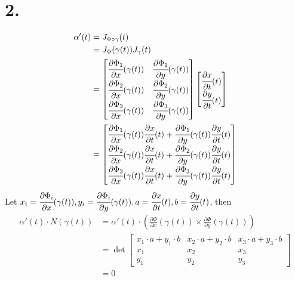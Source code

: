 \documentclass[11pt]{article}
\begin{document}
\section*{2.}
\begin{equation*}
    \begin{aligned}
        \alpha'(t) 
        &= J_{\Phi \circ \gamma}(t) \\
        &= J_\Phi(\gamma(t)) J_\gamma(t) \\
        &= 
        \begin{bmatrix}
            \cfrac{\partial \Phi_1}{\partial x}(\gamma(t)) & \cfrac{\partial \Phi_1}{\partial y}(\gamma(t)) \\
            \cfrac{\partial \Phi_2}{\partial x}(\gamma(t)) & \cfrac{\partial \Phi_2}{\partial y}(\gamma(t)) \\
            \cfrac{\partial \Phi_3}{\partial x}(\gamma(t)) & \cfrac{\partial \Phi_3}{\partial y}(\gamma(t)) 
        \end{bmatrix}
        \begin{bmatrix}
            \cfrac{\partial x}{\partial t}(t) \\
            \cfrac{\partial y}{\partial t}(t) 
        \end{bmatrix} \\
        &= 
        \begin{bmatrix}
            \cfrac{\partial \Phi_1}{\partial x}(\gamma(t)) \cfrac{\partial x}{\partial t}(t) + \cfrac{\partial \Phi_1}{\partial y}(\gamma(t)) \cfrac{\partial y}{\partial t}(t) \\
            \cfrac{\partial \Phi_2}{\partial x}(\gamma(t)) \cfrac{\partial x}{\partial t}(t) + \cfrac{\partial \Phi_2}{\partial y}(\gamma(t)) \cfrac{\partial y}{\partial t}(t) \\
            \cfrac{\partial \Phi_3}{\partial x}(\gamma(t)) \cfrac{\partial x}{\partial t}(t) + \cfrac{\partial \Phi_3}{\partial y}(\gamma(t)) \cfrac{\partial y}{\partial t}(t) 
        \end{bmatrix}
    \end{aligned}
\end{equation*}
Let $
x_i = \cfrac{\partial \Phi_i}{\partial x}(\gamma(t)), 
y_i = \cfrac{\partial \Phi_i}{\partial y}(\gamma(t)), 
a = \cfrac{\partial x}{\partial t}(t), 
b =\cfrac{\partial y}{\partial t}(t)$, then 
\begin{equation*}
    \begin{aligned}
        \alpha'(t) \cdot N(\gamma(t)) 
        &= \alpha'(t) \cdot \left( \frac{\partial \Phi}{\partial x}(\gamma(t)) \times \frac{\partial \Phi}{\partial y}(\gamma(t)) \right) \\
        &= 
        \det 
        \begin{bmatrix}
            x_1 \cdot a + y_1 \cdot b & x_2 \cdot a + y_2 \cdot b & x_3 \cdot a + y_3 \cdot b \\
            x_1 & x_2 & x_3 \\
            y_1 & y_2 & y_3 
        \end{bmatrix} \\
        &= 0
    \end{aligned}
\end{equation*}
\end{document}
